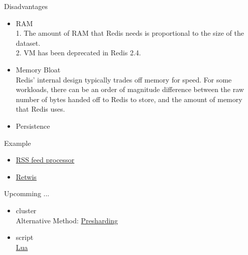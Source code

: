 \documentclass{beamer}
\begin{document}
\begin{frame}{Disadvantages}
  \begin{itemize}
  \item RAM \\
    1. The amount of RAM that Redis needs is proportional to the size of the dataset. \\
    2. VM has been deprecated in Redis 2.4. \\
  \item Memory Bloat \\
    Redis' internal design typically trades off memory for speed. For some workloads, there can be an order of magnitude difference between the raw number of bytes handed off to Redis to store, and the amount of memory that Redis uses. \\
  \item Persistence
  \end{itemize}
\end{frame}





\begin{frame}{Example}
  \begin{itemize}
    \pause
  \item \href{http://santosh-log.heroku.com/2011/08/07/building-a-rss-feed-processor-with-redis/}{RSS feed processor} \\
    \pause
  \item \href{http://redis.io/topics/twitter-clone}{Retwis} \\
  \end{itemize}
\end{frame}





\begin{frame}{Upcomming ...}
  \begin{itemize}
  \item cluster \\
    Alternative Method: \href{http://antirez.com/post/redis-presharding.html}{Presharding} \\
  \item script \\
    \href{http://antirez.com/post/redis-and-scripting.html}{Lua} \\
  \end{itemize}
\end{frame}
\end{document}
